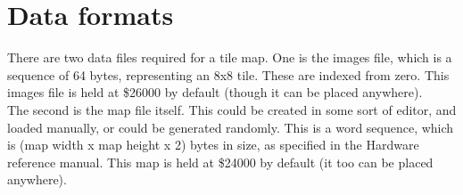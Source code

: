 \section{Data formats}

There are two data files required for a tile map. One is the images file, which is a sequence of 64 bytes, representing an 8x8 tile. These are indexed from zero. This images file is held at \$26000 by default (though it can be placed anywhere). \\

The second is the map file itself. This could be created in some sort of editor, and loaded manually, or could be generated randomly. This is a word sequence, which is (map width x map height x 2) bytes in size, as specified in the Hardware reference manual. This map is held at \$24000 by default (it too can be placed anywhere).